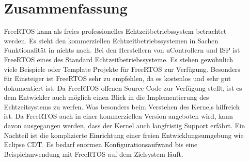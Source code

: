 \section{Zusammenfassung}
FreeRTOS kann als freies professionelles Echtzeitbetriebssystem betrachtet werden. Es steht den kommerziellen Echtzeitbetriebssystemen in Sachen Funktionalität in nichts nach. Bei den Herstellern von uControllern und ISP ist FreeRTOS eines des Standard Echtzeitbetriebssysteme. Es stehen gewöhnlich viele Beispiele oder Template Projekte für FreeRTOS zur Verfügung.  Besonders für Einsteiger ist FreeRTOS sehr zu empfehlen, da es kostenlos und sehr gut dokumentiert ist. Da FreeRTOS offenen Source Code zur Verfügung stellt, ist es dem Entwickler auch möglich einen Blick in die Implementierung des Echtzeitsystems zu werfen. Was besonders beim Verstehen des Kernels hilfreich ist. Da FreeRTOS auch in einer kommerziellen Version angeboten wird, kann davon ausgegangen werden, dass der Kernel auch langfristig Support erfährt. Ein Nachteil ist die komplizierte Einrichtung einer freien Entwicklungsumgebung wie Eclipse CDT. Es bedarf enormen Konfigurationsaufwand bis eine Beispielanwendung mit FreeRTOS auf dem Zielsystem läuft.     